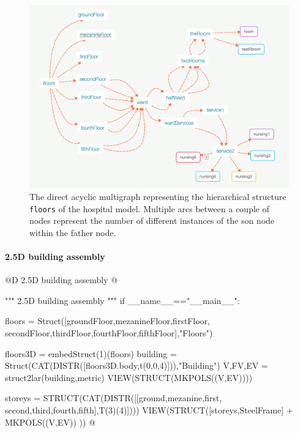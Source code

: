 \documentclass[11pt,oneside]{article}    %
\begin{document}
\begin{figure}[htbp] %
   \centering
   \includegraphics[width=\linewidth]{images/multigraph} 
   \caption{The direct acyclic multigraph representing the hierarchical structure \texttt{floors} of the hospital model. 
   Multiple arcs between a couple of nodes represent the number of different instances of the son node within the father node.}
   \label{fig:multigraph}
\end{figure}

\paragraph{2.5D building assembly}
@D 2.5D building assembly
@{""" 2.5D building assembly """       
if __name__=="__main__":
 
    floors = Struct([groundFloor,mezanineFloor,firstFloor,
                     secondFloor,thirdFloor,fourthFloor,fifthFloor],"Floors")
    
    floors3D = embedStruct(1)(floors)
    building = Struct(CAT(DISTR([floors3D.body,t(0,0,4)])),"Building")
    V,FV,EV = struct2lar(building,metric)
    VIEW(STRUCT(MKPOLS((V,EV))))
    
    storeys = STRUCT(CAT(DISTR([[ground,mezanine,first,
    				second,third,fourth,fifth],T(3)(4)])))
    VIEW(STRUCT([storeys,SteelFrame] + MKPOLS((V,EV)) ))
@}
\end{document}
